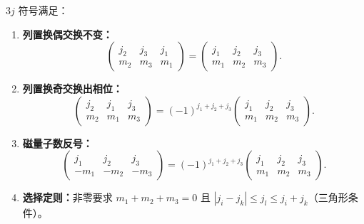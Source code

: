 \begin{proposition}[3j 符号的对称性质]
$3j$ 符号满足：
\begin{enumerate}[label=(\roman*),leftmargin=3em]
\item \textbf{列置换偶交换不变：}
\[
\begin{pmatrix}j_2&j_3&j_1\\m_2&m_3&m_1\end{pmatrix}
=
\begin{pmatrix}j_1&j_2&j_3\\m_1&m_2&m_3\end{pmatrix}.
\]
\item \textbf{列置换奇交换出相位：}
\[
\begin{pmatrix}j_2&j_1&j_3\\m_2&m_1&m_3\end{pmatrix}
=(-1)^{j_1+j_2+j_3}
\begin{pmatrix}j_1&j_2&j_3\\m_1&m_2&m_3\end{pmatrix}.
\]
\item \textbf{磁量子数反号：}
\[
\begin{pmatrix}j_1&j_2&j_3\\-m_1&-m_2&-m_3\end{pmatrix}
=(-1)^{j_1+j_2+j_3}
\begin{pmatrix}j_1&j_2&j_3\\m_1&m_2&m_3\end{pmatrix}.
\]
\item \textbf{选择定则：}非零要求 $m_1+m_2+m_3=0$ 且 $|j_i-j_k|\le j_l\le j_i+j_k$（三角形条件）。
\end{enumerate}
\label{prop:3j-symmetry}
\end{proposition}

